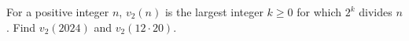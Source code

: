 For a positive integer $ n $, $ v_2(n)$ is the largest integer $ k\ge0 $ for which $ 2^k $ divides $ n $. Find $ v_2(2024)$ and $ v_2(12\cdot20)$.
